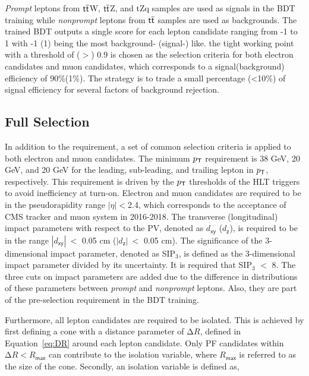 \emph{Prompt} leptons from $\textsf{t}\overline{\textsf{t}}$W, $\textsf{t}\overline{\textsf{t}}$Z, and tZq samples are used as signals in the \ac{BDT} training while \emph{nonprompt} leptons from $\textsf{t}\overline{\textsf{t}}$ samples are used as backgrounds. The trained \ac{BDT} outputs a single score for each lepton candidate ranging from -1 to 1 with -1 (1) being the most background- (signal-) like. the tight working point with a threshold of ($>$) 0.9 is chosen as the selection criteria for both electron candidates and muon candidates, which corresponds to a signal(background) efficiency of 90\%(1\%). The strategy is to trade a small percentage (<10\%) of signal efficiency for several factors of background rejection. 
\subsection{Full Selection}
\label{subsec:FullSel}

In addition to the \TOP requirement, a set of common selection criteria is applied to both electron and muon candidates. The minimum $p_{\textsf{T}}$ requirement is 38 GeV, 20 GeV, and 20 GeV for the leading, sub-leading, and trailing lepton in $p_{\textsf{T}}$, respectively. This requirement is driven by the $p_{\textsf{T}}$ thresholds of the \ac{HLT} triggers to avoid inefficiency at turn-on. Electron and muon candidates are required to be in the pseudorapidity range $|\eta|<$2.4, which corresponds to the acceptance of \ac{CMS} tracker and muon system in 2016-2018. The transverse (longitudinal) impact parameters with respect to the \ac{PV}, denoted as $d_{\textsf{xy}}$ ($d_{\textsf{z}}$), is required to be in the range $|d_{\textsf{xy}}|~<$ 0.05 cm ($|d_{\textsf{z}}|~<$ 0.05 cm). The significance of the 3-dimensional impact parameter, denoted as SIP$_3$, is defined as the 3-dimensional impact parameter divided by its uncertainty. It is required that SIP$_3$ $<$ 8. The three cuts on impact parameters are added due to the difference in distributions of these parameters between \emph{prompt} and \emph{nonprompt} leptons. Also, they are part of the pre-selection requirement in the \ac{BDT} training.

Furthermore, all lepton candidates are required to be isolated. This is achieved by first defining a cone with a distance parameter of $\mathrm{\Delta}R$, defined in Equation~\ref{eq:DR} around each lepton candidate. Only \ac{PF} candidates within $\mathrm{\Delta}R<R_{\textsf{max}}$ can contribute to the isolation variable, where $R_{\textsf{max}}$ is referred to as the size of the cone. Secondly, an isolation variable is defined as,

